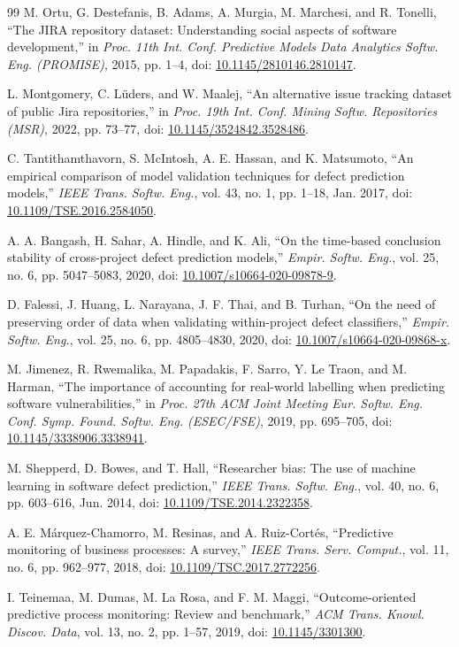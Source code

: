 \documentclass[journal]{IEEEtran}
\begin{document}
\begin{thebibliography}{99}
 M. Ortu, G. Destefanis, B. Adams, A. Murgia, M. Marchesi, and R. Tonelli, ``The JIRA repository dataset: Understanding social aspects of software development,'' in \emph{Proc. 11th Int. Conf. Predictive Models Data Analytics Softw. Eng. (PROMISE)}, 2015, pp. 1--4, doi: \url{10.1145/2810146.2810147}.

 L. Montgomery, C. L\"uders, and W. Maalej, ``An alternative issue tracking dataset of public Jira repositories,'' in \emph{Proc. 19th Int. Conf. Mining Softw. Repositories (MSR)}, 2022, pp. 73--77, doi: \url{10.1145/3524842.3528486}.

 C. Tantithamthavorn, S. McIntosh, A. E. Hassan, and K. Matsumoto, ``An empirical comparison of model validation techniques for defect prediction models,'' \emph{IEEE Trans. Softw. Eng.}, vol. 43, no. 1, pp. 1--18, Jan. 2017, doi: \url{10.1109/TSE.2016.2584050}.

 A. A. Bangash, H. Sahar, A. Hindle, and K. Ali, ``On the time-based conclusion stability of cross-project defect prediction models,'' \emph{Empir. Softw. Eng.}, vol. 25, no. 6, pp. 5047--5083, 2020, doi: \url{10.1007/s10664-020-09878-9}.

 D. Falessi, J. Huang, L. Narayana, J. F. Thai, and B. Turhan, ``On the need of preserving order of data when validating within-project defect classifiers,'' \emph{Empir. Softw. Eng.}, vol. 25, no. 6, pp. 4805--4830, 2020, doi: \url{10.1007/s10664-020-09868-x}.

 M. Jimenez, R. Rwemalika, M. Papadakis, F. Sarro, Y. Le Traon, and M. Harman, ``The importance of accounting for real-world labelling when predicting software vulnerabilities,'' in \emph{Proc. 27th ACM Joint Meeting Eur. Softw. Eng. Conf. Symp. Found. Softw. Eng. (ESEC/FSE)}, 2019, pp. 695--705, doi: \url{10.1145/3338906.3338941}.

 M. Shepperd, D. Bowes, and T. Hall, ``Researcher bias: The use of machine learning in software defect prediction,'' \emph{IEEE Trans. Softw. Eng.}, vol. 40, no. 6, pp. 603--616, Jun. 2014, doi: \url{10.1109/TSE.2014.2322358}.

 A. E. M\'arquez-Chamorro, M. Resinas, and A. Ruiz-Cort\'es, ``Predictive monitoring of business processes: A survey,'' \emph{IEEE Trans. Serv. Comput.}, vol. 11, no. 6, pp. 962--977, 2018, doi: \url{10.1109/TSC.2017.2772256}.

 I. Teinemaa, M. Dumas, M. La Rosa, and F. M. Maggi, ``Outcome-oriented predictive process monitoring: Review and benchmark,'' \emph{ACM Trans. Knowl. Discov. Data}, vol. 13, no. 2, pp. 1--57, 2019, doi: \url{10.1145/3301300}.


\end{thebibliography}
\end{document}
